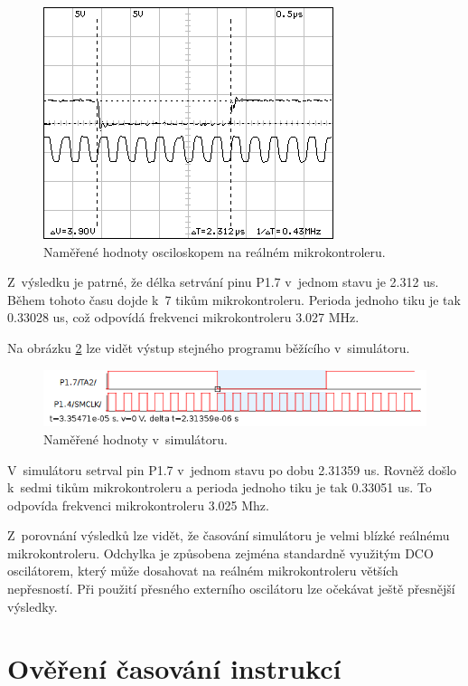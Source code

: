 \begin{figure}[ht]
\centering
\includegraphics[trim=0cm 0cm 0cm 0cm, scale=1]{fig/dso04}
\caption{Naměřené hodnoty osciloskopem na reálném mikrokontroleru.}
\label{fig:dso04osc}
\end{figure}

Z~výsledku je patrné, že délka setrvání pinu P1.7 v~jednom stavu je 2.312 us. Během tohoto času dojde k~7 tikům mikrokontroleru. Perioda jednoho tiku je tak 0.33028 us, což odpovídá frekvenci mikrokontroleru 3.027 MHz.

Na obrázku \ref{fig:dso04sim} lze vidět výstup stejného programu běžícího v~simulátoru.

\begin{figure}[ht]
\centering
\includegraphics[trim=0cm 0cm 0cm 0cm, scale=0.8]{fig/dso04sim}
\caption{Naměřené hodnoty v~simulátoru.}
\label{fig:dso04sim}
\end{figure}

V~simulátoru setrval pin P1.7 v~jednom stavu po dobu 2.31359 us. Rovněž došlo k~sedmi tikům mikrokontroleru a perioda jednoho tiku je tak 0.33051 us. To odpovída frekvenci mikrokontroleru 3.025 Mhz.

Z~porovnání výsledků lze vidět, že časování simulátoru je velmi blízké reálnému mikrokontroleru. Odchylka je způsobena zejména standardně využitým DCO oscilátorem, který může dosahovat na reálném mikrokontroleru větších nepřesností. Při použití přesného externího oscilátoru lze očekávat ještě přesnější výsledky.

\section{Ověření časování instrukcí}
\label{test2}


